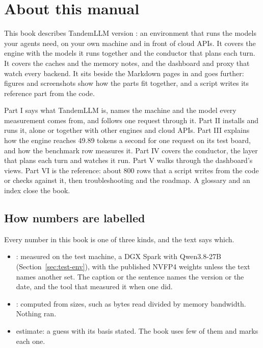 \chapter*{About this manual}

This book describes TandemLLM version \version: an environment that runs the models your agents need, on your own machine and in front of cloud APIs. It covers the engine with the models it runs together and the conductor that plans each turn. It covers the caches and the memory notes, and the dashboard and proxy that watch every backend. It sits beside the Markdown pages in  and goes further: figures and screenshots show how the parts fit together, and a script writes its reference part from the code.

Part I says what TandemLLM is, names the machine and the model every measurement comes from, and follows one request through it. Part II installs and runs it, alone or together with other engines and cloud APIs. Part III explains how the engine reaches 49.89 tokens a second for one request on its test board, and how the benchmark row measures it. Part IV covers the conductor, the layer that plans each turn and watches it run. Part V walks through the dashboard's views. Part VI is the reference: about 800 rows that a script writes from the code or checks against it, then troubleshooting and the roadmap. A glossary and an index close the book.

\section*{How numbers are labelled}

Every number in this book is one of three kinds, and the text says which.

\begin{itemize}
\item \measured: measured on the test machine, a DGX Spark with Qwen3.8-27B (Section~\ref{sec:test-env}), with the published NVFP4 weights unless the text names another set. The caption or the sentence names the version or the date, and the tool that measured it when one did.
\item \arith: computed from sizes, such as bytes read divided by memory bandwidth. Nothing ran.
\item estimate: a guess with its basis stated. The book uses few of them and marks each one.
\end{itemize}

